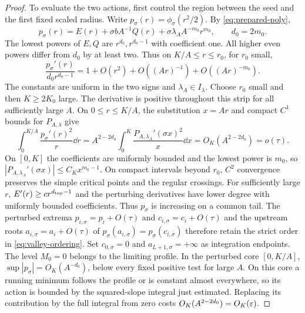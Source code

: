 \begin{proof}
To evaluate the two actions, first control the region between the seed
and the first fixed scaled radius. Write $p_\sigma(r)=\phi_\sigma(r^2/2)$.
By \eqref{eq:prepared-poly},
\[
 p_\sigma(r)=E(r)+\sigma b A^{-1}Q(r)
                    +\sigma\lambda_A A^{-m_0}r^{m_0},
 \qquad d_0=2m_0 .
\]
The lowest powers of $E,Q$ are $r^{d_0},r^{d_0-1}$ with coefficient one.
All higher even powers differ from $d_0$ by at least two. Thus on
$K/A\le r\le r_0$, for $r_0$ small,
\[
 \frac{p_\sigma'(r)}{d_0 r^{d_0-1}}
 =1+O(r^2)+O((Ar)^{-1})+O((Ar)^{-m_0}).
\]
The constants are uniform in the two signs and $\lambda_A\in I_\lambda$.
Choose $r_0$ small and then $K\ge 2K_0$ large. The derivative is
positive throughout this strip for all sufficiently large $A$. On
$0\le r\le K/A$, the substitution $x=Ar$ and compact $C^1$ bounds
for $P_{A,\lambda}$ give
\[
 \int_0^{K/A}\frac{p_\sigma'(r)^2}{r}\dd r
 = A^{2-2d_0}\int_0^K\frac{P_{A,\lambda_A}'(\sigma x)^2}{x}\dd x
 = O_K(A^{2-2d_0})=o(\tau).
\]
On $[0,K]$ the coefficients are uniformly bounded and the lowest
power is $m_0$, so $|P_{A,\lambda_A}'(\sigma x)|\le C_K x^{m_0-1}$.
On compact intervals beyond $r_0$, $C^2$ convergence preserves the
simple critical points and the regular crossings. For sufficiently
large $r$, $E'(r)\ge c r^{d_{\rm top}-1}$ and the perturbing
derivatives have lower degree with uniformly bounded coefficients.
Thus $p_\sigma$ is increasing on a common tail. The perturbed extrema
$p_{i,\sigma}=p_i+O(\tau)$ and $c_{i,\sigma}=c_i+O(\tau)$ and the
upstream roots $a_{i,\sigma}=a_i+O(\tau)$ of
$p_\sigma(a_{i,\sigma})=p_\sigma(c_{i,\sigma})$ therefore retain the
strict order in \eqref{eq:valley-ordering}. Set $c_{0,\sigma}=0$ and
$a_{L+1,\sigma}=+\infty$ as integration endpoints. The level $M_0=0$
belongs to the limiting profile. In the perturbed core $[0,K/A]$,
$\sup|p_\sigma|=O_K(A^{-d_0})$, below every fixed positive test for
large $A$. On this core a running minimum follows the profile or is
constant almost everywhere, so its action is bounded by the
squared-slope integral just estimated. Replacing its contribution by
the full integral from zero costs $O_K(A^{2-2d_0})=O_K(\varepsilon)$.


\end{proof}

